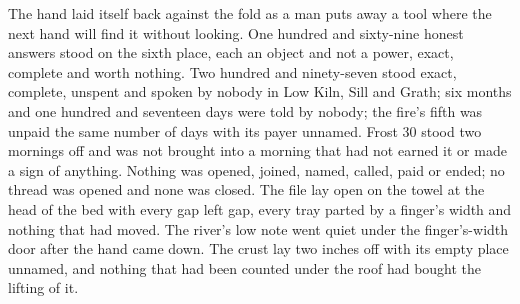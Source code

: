 The hand laid itself back against the fold as a man puts away a tool where the next hand will find it without looking. One hundred and sixty-nine honest answers stood on the sixth place, each an object and not a power, exact, complete and worth nothing. Two hundred and ninety-seven stood exact, complete, unspent and spoken by nobody in Low Kiln, Sill and Grath; six months and one hundred and seventeen days were told by nobody; the fire's fifth was unpaid the same number of days with its payer unnamed. Frost 30 stood two mornings off and was not brought into a morning that had not earned it or made a sign of anything. Nothing was opened, joined, named, called, paid or ended; no thread was opened and none was closed. The file lay open on the towel at the head of the bed with every gap left gap, every tray parted by a finger's width and nothing that had moved. The river's low note went quiet under the finger's-width door after the hand came down. The crust lay two inches off with its empty place unnamed, and nothing that had been counted under the roof had bought the lifting of it.
